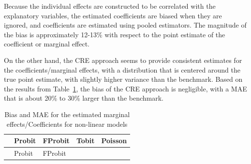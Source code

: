 \documentclass[bib]{statapress}
\begin{document}
Because the individual effects are constructed to be correlated with the
explanatory variables, the estimated coefficients are biased when they
are ignored, and coefficients are estimated using pooled estimators. The
magnitude of the bias is approximately 12-13\% with respect to the point
estimate of the coefficient or marginal effect.

On the other hand, the CRE approach seems to provide consistent
estimates for the coefficients/marginal effects, with a distribution
that is centered around the true point estimate, with slightly higher
variance than the benchmark. Based on the results from
Table~\ref{tbl-cre}, the bias of the CRE approach is negligible, with a
MAE that is about 20\% to 30\% larger than the benchmark.

\begin{longtable}[]{@{}
  >{\raggedright\arraybackslash}p{}
  >{\centering\arraybackslash}p{}
  >{\centering\arraybackslash}p{}
  >{\centering\arraybackslash}p{}
  >{\centering\arraybackslash}p{}@{}}
\caption{Bias and MAE for the estimated marginal effects/Coefficients
for non-linear models}\label{tbl-cre}\tabularnewline
\toprule\noalign{}
\begin{minipage}[b]{\linewidth}\raggedright
\end{minipage} & \begin{minipage}[b]{\linewidth}\centering
Probit
\end{minipage} & \begin{minipage}[b]{\linewidth}\centering
FProbit
\end{minipage} & \begin{minipage}[b]{\linewidth}\centering
Tobit
\end{minipage} & \begin{minipage}[b]{\linewidth}\centering
Poisson
\end{minipage} \\
\midrule\noalign{}
\endfirsthead
\toprule\noalign{}
\begin{minipage}[b]{\linewidth}\raggedright
\end{minipage} & \begin{minipage}[b]{\linewidth}\centering
Probit
\end{minipage} & \begin{minipage}[b]{\linewidth}\centering
FProbit
\end{minipage} & \begin{minipage}[b]{\linewidth}\centering

\end{minipage}
\end{longtable}
\end{document}
